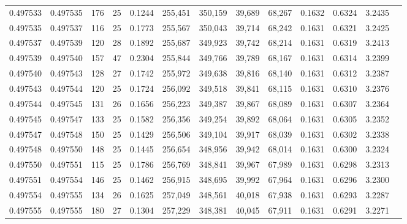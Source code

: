 \begin{tabular}{rrrrrrrrrrrrr}
0.497533 & 0.497535 & 176 &  25 &                                     0.1244 & 255,451 & 350,159 &  39,689 &  68,267 & 0.1632 & 0.6324 & 3.2435 \\
0.497535 & 0.497537 & 116 &  25 &                                     0.1773 & 255,567 & 350,043 &  39,714 &  68,242 & 0.1631 & 0.6321 & 3.2425 \\
0.497537 & 0.497539 & 120 &  28 &                                     0.1892 & 255,687 & 349,923 &  39,742 &  68,214 & 0.1631 & 0.6319 & 3.2413 \\
0.497539 & 0.497540 & 157 &  47 &                                     0.2304 & 255,844 & 349,766 &  39,789 &  68,167 & 0.1631 & 0.6314 & 3.2399 \\
0.497540 & 0.497543 & 128 &  27 &                                     0.1742 & 255,972 & 349,638 &  39,816 &  68,140 & 0.1631 & 0.6312 & 3.2387 \\
0.497543 & 0.497544 & 120 &  25 &                                     0.1724 & 256,092 & 349,518 &  39,841 &  68,115 & 0.1631 & 0.6310 & 3.2376 \\
0.497544 & 0.497545 & 131 &  26 &                                     0.1656 & 256,223 & 349,387 &  39,867 &  68,089 & 0.1631 & 0.6307 & 3.2364 \\
0.497545 & 0.497547 & 133 &  25 &                                     0.1582 & 256,356 & 349,254 &  39,892 &  68,064 & 0.1631 & 0.6305 & 3.2352 \\
0.497547 & 0.497548 & 150 &  25 &                                     0.1429 & 256,506 & 349,104 &  39,917 &  68,039 & 0.1631 & 0.6302 & 3.2338 \\
0.497548 & 0.497550 & 148 &  25 &                                     0.1445 & 256,654 & 348,956 &  39,942 &  68,014 & 0.1631 & 0.6300 & 3.2324 \\
0.497550 & 0.497551 & 115 &  25 &                                     0.1786 & 256,769 & 348,841 &  39,967 &  67,989 & 0.1631 & 0.6298 & 3.2313 \\
0.497551 & 0.497554 & 146 &  25 &                                     0.1462 & 256,915 & 348,695 &  39,992 &  67,964 & 0.1631 & 0.6296 & 3.2300 \\
0.497554 & 0.497555 & 134 &  26 &                                     0.1625 & 257,049 & 348,561 &  40,018 &  67,938 & 0.1631 & 0.6293 & 3.2287 \\
0.497555 & 0.497555 & 180 &  27 &                                     0.1304 & 257,229 & 348,381 &  40,045 &  67,911 & 0.1631 & 0.6291 & 3.2271 \\

\end{tabular}
